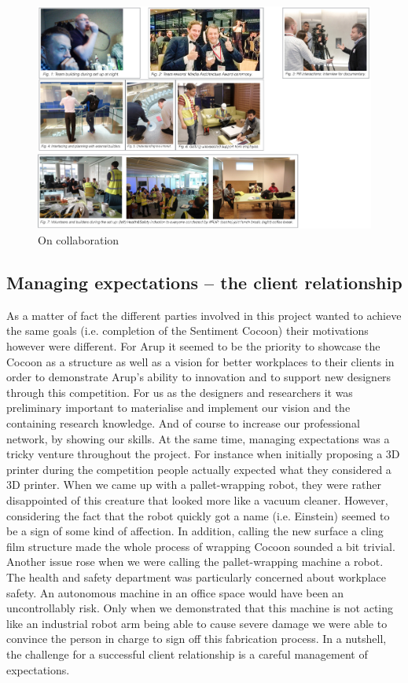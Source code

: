 \begin{figure}[!h] 
\centering
\includegraphics[width=\textwidth]{Illustrations/OnCollaboration.png}
\caption [On collaboration] {On collaboration}
\label{OnCollaboration}
\end{figure}



\subsection*{Managing expectations – the client relationship}

As a matter of fact the different parties involved in this project wanted to achieve the same goals (i.e. completion of the Sentiment Cocoon) their motivations however were different. For Arup it seemed to be the priority to showcase the Cocoon as a structure as well as a vision for better workplaces to their clients in order to demonstrate Arup’s ability to innovation and to support new designers through this competition.
For us as the designers and researchers it was preliminary important to materialise and implement our vision and the containing research knowledge. And of course to increase our professional network, by showing our skills. 
At the same time, managing expectations was a tricky venture throughout the project. For instance when initially proposing a 3D printer during the competition people actually expected what they considered a 3D printer. When we came up with a pallet-wrapping robot, they were rather disappointed of this creature that looked more like a vacuum cleaner. However, considering the fact that the robot quickly got a name (i.e. Einstein) seemed to be a sign of some kind of affection. In addition, calling the new surface a cling film structure made the whole process of wrapping Cocoon sounded a bit trivial. 
Another issue rose when we were calling the pallet-wrapping machine a robot. The health and safety department was particularly concerned about workplace safety. An autonomous machine in an office space would have been an uncontrollably risk. Only when we demonstrated that this machine is not acting like an industrial robot arm being able to cause severe damage we were able to convince the person in charge to sign off this fabrication process.
In a nutshell, the challenge for a successful client relationship is a careful management of expectations.

